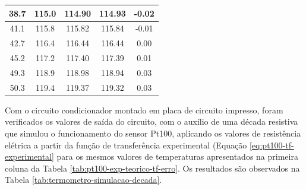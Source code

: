 \documentclass[a4paper]{instrumentacao}
\begin{document}
\begin{table}[H]
\begin{tabular}{|c|c|c|c|c|}
38.7           & 115.0                 & 114.90                     & 114.93                & -0.02                        \\ \hline
41.1           & 115.8                 & 115.82                     & 115.84                & -0.01                        \\ \hline
42.7           & 116.4                 & 116.44                     & 116.44                & 0.00                         \\ \hline
45.2           & 117.2                 & 117.40                     & 117.39                & 0.01                         \\ \hline
49.3           & 118.9                 & 118.98                     & 118.94                & 0.03                         \\ \hline
50.3           & 119.4                 & 119.37                     & 119.32                & 0.03                         \\ \hline
\end{tabular}
\end{table}

Com o circuito condicionador montado em placa de circuito impresso, foram verificados os valores de saída do circuito, com o auxílio de uma década resistiva que simulou o funcionamento do sensor Pt100, aplicando os valores de resistência elétrica a partir da função de transferência experimental (Equação \ref{eq:pt100-tf-experimental} para os mesmos valores de temperaturas apresentados na primeira coluna da Tabela \ref{tab:pt100-exp-teorico-tf-erro}. Os resultados são observados na Tabela \ref{tab:termometro-simulacao-decada}.
\end{document}
